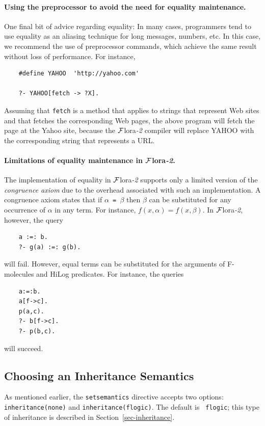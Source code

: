 \documentclass[11pt]{article}
\newcommand{\FLORA}{{\mbox{\sc ${\cal F}${lora}\rm\emph{-2}}}\xspace}
\begin{document}
\paragraph{Using the preprocessor to avoid the need for equality maintenance.}
One final bit of advice regarding equality: In many cases, programmers tend to use
equality as an aliasing technique for long messages, numbers, etc. In this
case, we recommend the use of preprocessor commands, which achieve the same
result without loss of performance. For instance,

\begin{verbatim}
    #define YAHOO  'http://yahoo.com'  

    ?- YAHOO[fetch -> ?X].
\end{verbatim}
\noindent
Assuming that {\tt fetch} is a method that applies to strings that
represent Web sites and that fetches the corresponding Web pages, the above
program will fetch the page at the Yahoo site, because the \FLORA compiler will
replace YAHOO with the corresponding string that represents a URL.

\paragraph{Limitations of equality maintenance in \FLORA.}
The implementation of equality in \FLORA supports only a limited
version of the
\emph{congruence axiom} due to the overhead associated with such an
implementation. A congruence axiom states that if {\tt $\alpha$ = $\beta$}
then {\tt $\beta$} can be substituted for any occurrence of $\alpha$ in any
term. For instance, $f(x,\alpha) = f(x,\beta)$. In \FLORA, however, the query
\begin{verbatim}
    a :=: b.
    ?- g(a) :=: g(b).
\end{verbatim}
will fail. However,
equal terms can be substituted for the arguments of
F-molecules and HiLog predicates. For instance, the queries
\begin{verbatim}
    a:=:b.
    a[f->c].
    p(a,c).
    ?- b[f->c].  
    ?- p(b,c).
\end{verbatim}
will succeed.


\subsection{Choosing an Inheritance Semantics}\label{sec-inheritance-directive}

As mentioned earlier, the {\tt setsemantics} directive accepts two options:
{\tt inheritance(none)} and {\tt inheritance(flogic)}.  The default is {\tt
  flogic}; this type of inheritance is described in
Section~\ref{sec-inheritance}.
\end{document}
